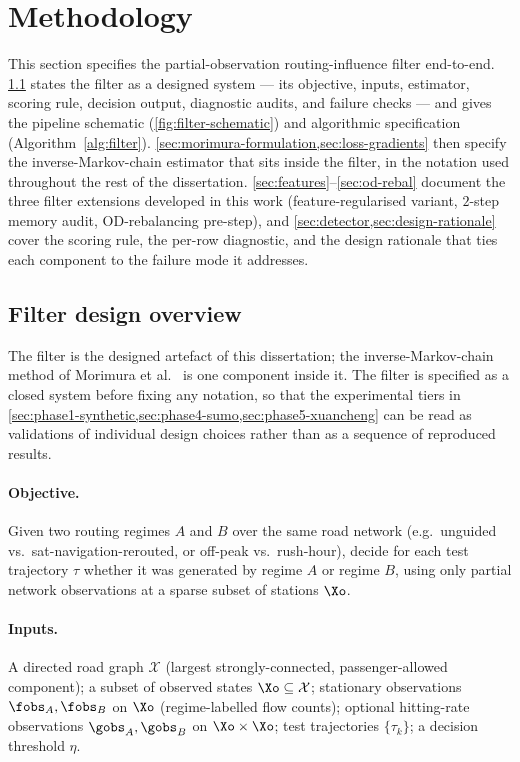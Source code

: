 \section{Methodology}\label{sec:methodology}

This section specifies the partial-observation routing-influence filter
end-to-end. \cref{sec:filter-design} states the filter as a designed
system --- its objective, inputs, estimator, scoring rule, decision
output, diagnostic audits, and failure checks --- and gives the
pipeline schematic (\cref{fig:filter-schematic}) and algorithmic
specification (Algorithm~\ref{alg:filter}).
\cref{sec:morimura-formulation,sec:loss-gradients} then specify the
inverse-Markov-chain estimator that sits inside the filter, in
the notation used throughout the rest of the dissertation.
\cref{sec:features}--\ref{sec:od-rebal} document the three filter
extensions developed in this work (feature-regularised variant,
$2$-step memory audit, OD-rebalancing pre-step), and
\cref{sec:detector,sec:design-rationale} cover the scoring rule, the
per-row diagnostic, and the design rationale that ties each component
to the failure mode it addresses.

\subsection{Filter design overview}
\label{sec:filter-design}

The filter is the designed artefact of this dissertation; the
inverse-Markov-chain method of Morimura et al.~\cite{morimura2013} is one component
inside it. The filter is specified as a closed system before fixing any
notation, so that the experimental tiers in
\cref{sec:phase1-synthetic,sec:phase4-sumo,sec:phase5-xuancheng} can be
read as validations of individual design choices rather than as a
sequence of reproduced results.

\paragraph{Objective.} Given two routing regimes $A$ and $B$ over the
same road network (e.g.\ unguided vs.\ sat-navigation-rerouted, or
off-peak vs.\ rush-hour), decide for each test trajectory $\tau$ whether
it was generated by regime $A$ or regime $B$, using only partial
network observations at a sparse subset of stations $\Xo$.

\paragraph{Inputs.} A directed road graph $\mathcal{X}$ (largest
strongly-connected, passenger-allowed component); a subset of observed
states $\Xo \subseteq \mathcal{X}$; stationary observations $\fobs_A,
\fobs_B$ on $\Xo$ (regime-labelled flow counts); optional hitting-rate
observations $\gobs_A, \gobs_B$ on $\Xo \times \Xo$; test trajectories
$\{\tau_k\}$; a decision threshold $\eta$.

